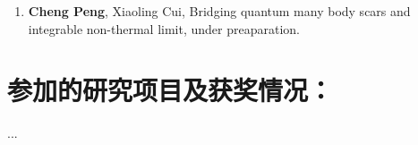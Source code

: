 {
\setlist[enumerate]{}%

\begin{enumerate}[nosep]
    \item {\bfseries\sffamily Cheng Peng}, Xiaoling Cui, Bridging quantum many body scars and integrable non-thermal limit, under preaparation.
\end{enumerate}
}



\section*{参加的研究项目及获奖情况：}
...

\cleardoublepage[plain]%

